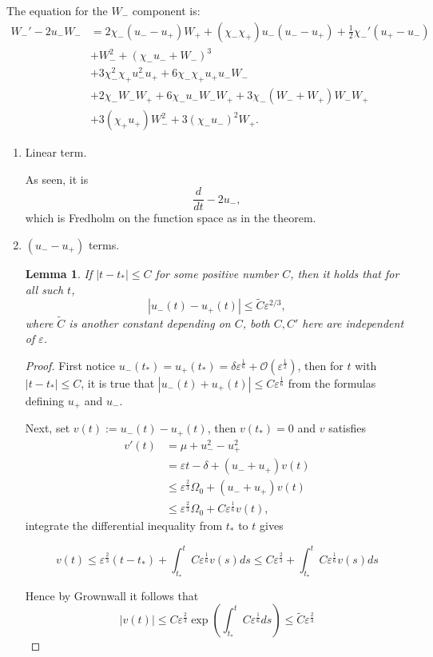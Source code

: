 \documentclass[letterpaper,11pt]{article}
\newcommand{\rmO}{\mathcal{O}}
\newcommand{\eps}{\varepsilon}
\numberwithin{equation}{section}
\theoremstyle{plain}
\newtheorem{lemma}[theorem]{Lemma}
\begin{document}
\begin{itemize}
The equation for the $W_-$ component is:
\begin{align*}
W_-'  - 2u_-W_-&= 2\chi_-(u_- -u_+)W_+ + (\chi_-\chi_+) u_-(u_- -u_+)+\frac{1}{2}\chi_-'(u_+ -u_-) \\
&+W_-^2+ (\chi_-u_- + W_-)^3\\
&+ 3\chi_-^2\chi_+ u_-^2 u_+ + 6\chi_-\chi_+ u_+ u_-W_-\\
 &+2\chi_-W_-W_+  + 6\chi_- u_- W_- W_+ + 3\chi_-(W_-+W_+)W_-W_+ \\&+3(\chi_+u_+)W_-^2 + 3(\chi_-u_-)^2W_+.
\end{align*}

\begin{enumerate}
\item Linear term.

As seen, it is 
\[
\frac{d}{dt} - 2u_-,
\]
which is Fredholm on the function space as in the theorem.


\item $(u_--u_+)$ terms.
\begin{lemma} \label{DifrEsti}
If $|t-t_*|\le C$ for some positive number $C$, then it holds that for all such $t$,
\[
|u_-(t)-u_+(t)| \le \tilde{C}\eps^{2/3},
\] 
where $\tilde{C}$ is another constant depending on $C$, both $C,C'$ here are independent of $\eps$.
\end{lemma}

\begin{proof}
First notice $u_-(t_*) = u_+(t_*) = \delta \eps^{\frac{1}{6}}+\rmO(\eps^{\frac{1}{2}})$, then for $t$ with $|t-t_*| \le C$, it is true that $|u_-(t)+u_+(t)| \le C\eps^\frac{1}{6}$ from the formulas defining $u_+$ and $u_-$.

Next, set $v(t):= u_-(t)-u_+(t)$, then $v(t_*) = 0$ and $v$ satisfies
\begin{align*}
v'(t) &= \mu+u_-^2-u_+^2 \\
&= \eps t -\delta + (u_- + u_+) v(t)\\
&\le \eps^{\frac{2}{3}}\Omega_0 +  (u_-+u_+) v(t)\\
&\le \eps^{\frac{2}{3}}\Omega_0 +  C\eps^{\frac{1}{6}} v(t),
\end{align*}
integrate the differential inequality from $t_*$ to $t$ gives

\[
v(t) \le \eps^{\frac{2}{3}}(t-t_*)+\int_{t_*}^t C\eps^{\frac{1}{6}}v(s)ds \le C\eps^{\frac{2}{3}}+\int_{t_*}^t C\eps^{\frac{1}{6}}v(s)ds
\]

Hence by Grownwall it follows that
\[
|v(t)| \le C\eps^{\frac{2}{3}}\exp\left(\int_{t_*}^t C\eps^{\frac{1}{6}}ds \right) \le \tilde{C}\eps^{\frac{2}{3}}
\]
\end{proof}


\end{enumerate}
\end{itemize}
\end{document}
